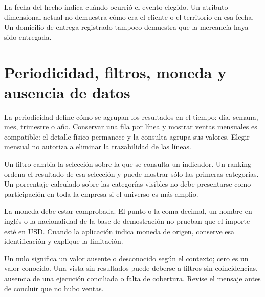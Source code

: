 La fecha del hecho indica cuándo ocurrió el evento elegido. Un atributo dimensional actual no demuestra cómo era el cliente o el territorio en esa fecha. Un domicilio de entrega registrado tampoco demuestra que la mercancía haya sido entregada.

\section{Periodicidad, filtros, moneda y ausencia de datos}
La periodicidad define cómo se agrupan los resultados en el tiempo: día, semana, mes, trimestre o año. Conservar una fila por línea y mostrar ventas mensuales es compatible: el detalle físico permanece y la consulta agrupa sus valores. Elegir mensual no autoriza a eliminar la trazabilidad de las líneas.

Un filtro cambia la selección sobre la que se consulta un indicador. Un ranking ordena el resultado de esa selección y puede mostrar sólo las primeras categorías. Un porcentaje calculado sobre las categorías visibles no debe presentarse como participación en toda la empresa si el universo es más amplio.

La moneda debe estar comprobada. El punto o la coma decimal, un nombre en inglés o la nacionalidad de la base de demostración no prueban que el importe esté en USD. Cuando la aplicación indica moneda de origen, conserve esa identificación y explique la limitación.

Un nulo significa un valor ausente o desconocido según el contexto; cero es un valor conocido. Una vista sin resultados puede deberse a filtros sin coincidencias, ausencia de una ejecución conciliada o falta de cobertura. Revise el mensaje antes de concluir que no hubo ventas.


